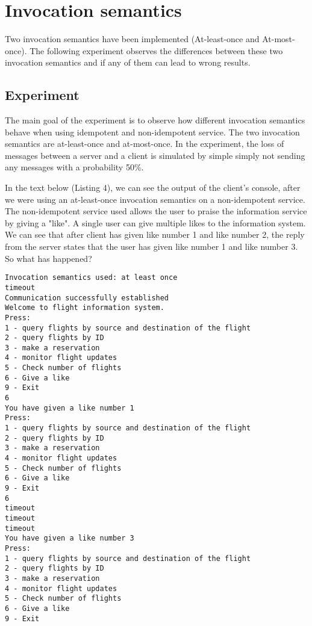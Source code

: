 \documentclass[12pt,a4paper]{article}
\begin{document}
\section{Invocation semantics}
Two invocation semantics have been implemented (At-least-once and At-most-once). The following experiment observes the differences between these two invocation semantics and if any of them can lead to wrong results.

\subsection{Experiment}
The main goal of the experiment is to observe how different invocation semantics behave when using idempotent and non-idempotent service. The two invocation semantics are at-least-once and at-most-once. In the experiment, the loss of messages between a server and a client is simulated by simple simply not sending any messages with a probability 50\%. \par \medskip In the text below (Listing 4), we can see the output of the client's console, after we were using an at-least-once invocation semantics on a non-idempotent service. The non-idempotent service used allows the user to praise the information service by giving a "like". A single user can give multiple likes to the information system. We can see that after client has given like number 1 and like number 2, the reply from the server states that the user has given like number 1 and like number 3. So what has happened?

\begin{lstlisting}[caption={Client console output},xleftmargin=.03\textwidth]
Invocation semantics used: at least once
timeout
Communication successfully established
Welcome to flight information system.
Press:
1 - query flights by source and destination of the flight
2 - query flights by ID
3 - make a reservation
4 - monitor flight updates
5 - Check number of flights
6 - Give a like
9 - Exit
6
You have given a like number 1
Press:
1 - query flights by source and destination of the flight
2 - query flights by ID
3 - make a reservation
4 - monitor flight updates
5 - Check number of flights
6 - Give a like
9 - Exit
6
timeout
timeout
timeout
You have given a like number 3
Press:
1 - query flights by source and destination of the flight
2 - query flights by ID
3 - make a reservation
4 - monitor flight updates
5 - Check number of flights
6 - Give a like
9 - Exit
\end{lstlisting}
\medskip
\end{document}
